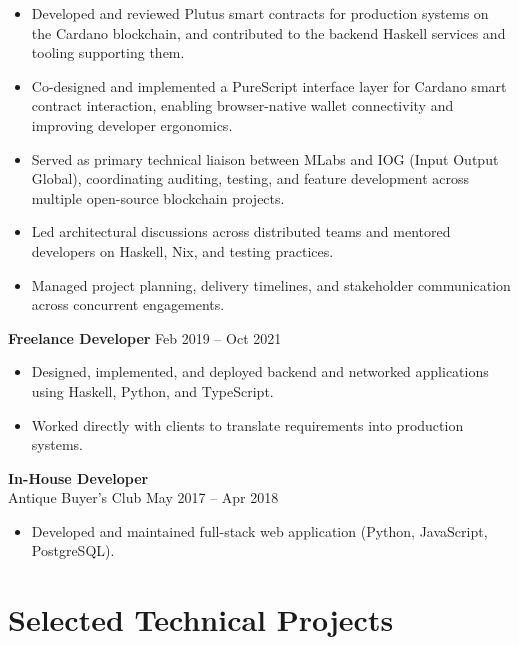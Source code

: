 \documentclass[10.5pt]{article}
\begin{document}
\begin{itemize}
    \item Developed and reviewed Plutus smart contracts for production systems on the Cardano blockchain, and contributed to the backend Haskell services and tooling supporting them.
    \item Co-designed and implemented a PureScript interface layer for Cardano smart contract interaction, enabling browser-native wallet connectivity and improving developer ergonomics.
    \item Served as primary technical liaison between MLabs and IOG (Input Output Global), coordinating auditing, testing, and feature development across multiple open-source blockchain projects.
    \item Led architectural discussions across distributed teams and mentored developers on Haskell, Nix, and testing practices.
    \item Managed project planning, delivery timelines, and stakeholder communication across concurrent engagements.
\end{itemize}

\vspace{6pt}

\textbf{Freelance Developer} \hfill Feb 2019 -- Oct 2021

\begin{itemize}
    \item Designed, implemented, and deployed backend and networked applications using Haskell, Python, and TypeScript.
    \item Worked directly with clients to translate requirements into production systems.
\end{itemize}

\vspace{6pt}

\textbf{In-House Developer} \\
Antique Buyer's Club \hfill May 2017 -- Apr 2018

\begin{itemize}
    \item Developed and maintained full-stack web application (Python, JavaScript, PostgreSQL).
\end{itemize}

\newpage

\section*{Selected Technical Projects}
\end{document}
